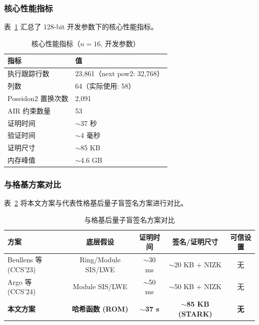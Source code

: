 \documentclass[11pt,a4paper]{ctexart}
\begin{document}
\subsubsection{核心性能指标}

表~\ref{tab:perf} 汇总了 128-bit 开发参数下的核心性能指标。

\begin{table}[h]
\centering
\caption{核心性能指标（$n=16$, 开发参数）}
\label{tab:perf}
\begin{tabular}{@{}ll@{}}
\toprule
\textbf{指标} & \textbf{值} \\
\midrule
执行跟踪行数   & 23,861（next pow2: 32,768） \\
列数           & 64（实际使用: 58） \\
Poseidon2 置换次数 & 2,091 \\
AIR 约束数量   & 53 \\
证明时间       & $\sim$37 秒 \\
验证时间       & $\sim$4 毫秒 \\
证明尺寸       & $\sim$85 KB \\
内存峰值       & $\sim$4.6 GB \\
\bottomrule
\end{tabular}
\end{table}

\subsubsection{与格基方案对比}

表~\ref{tab:comparison} 将本文方案与代表性格基后量子盲签名方案进行对比。

\begin{table}[h]
\centering
\caption{与格基后量子盲签名方案对比}
\label{tab:comparison}
\fontsize{8}{10}\selectfont
\begin{tabular}{@{}lcccc@{}}
\toprule
\textbf{方案} & \textbf{底层假设} & \textbf{证明时间} & \textbf{签名/证明尺寸} & \textbf{可信设置} \\
\midrule
Beullens 等 (CCS'23) \cite{Beullens2023LatticeBlind} & Ring/Module SIS/LWE & $\sim$30 ms & $\sim$20 KB + NIZK & 无 \\
Argo 等 (CCS'24) \cite{Argo2024PracticalPQ} & Module SIS/LWE & $\sim$50 ms & $\sim$50 KB + NIZK & 无 \\
\midrule
\textbf{本文方案} & \textbf{哈希函数 (ROM)} & $\sim$\textbf{37 s} & $\sim$\textbf{85 KB (STARK)} & \textbf{无} \\
\bottomrule
\end{tabular}
\end{table}
\end{document}
